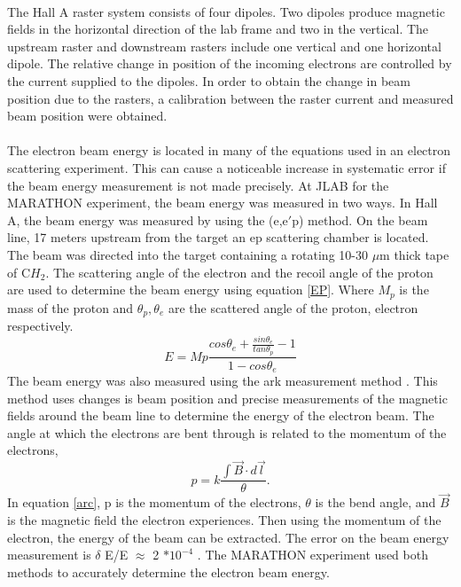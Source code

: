 	 \paragraph{} The Hall A raster system consists of four dipoles. Two dipoles produce magnetic fields in the horizontal direction of the lab frame and two in the vertical. The upstream raster and downstream rasters include one vertical and one horizontal dipole. The relative change in position of the incoming electrons are controlled by the current supplied to the dipoles. In order to obtain the change in beam position due to the rasters, a calibration between the raster current and measured beam position were obtained.  
	 
	 \paragraph{}The electron beam energy is located in many of the equations used in an electron scattering experiment. This can cause a noticeable increase in systematic error if the beam energy measurement is not made precisely. At JLAB for the MARATHON experiment, the beam energy was measured in two ways. In Hall A, the beam energy was measured by using the (e,e$\prime$p) method. On the beam line, 17 meters upstream from the target an ep scattering chamber is located. The beam was directed into the target containing a rotating 10-30 $\mu$m thick tape of C$H_2$. The scattering angle of the electron and the recoil angle of the proton are used to determine the beam energy using equation \ref{EP}. Where $M_p$ is the mass of the proton and $\theta_p, \theta_e$ are the scattered angle of the proton, electron respectively. 
	\begin{equation}
	\label{EP}
	E = Mp \frac{cos\theta_e + \frac{sin\theta_e}{tan\theta_p}-1}{1 - cos\theta_e} 
	\end{equation}
	The beam energy was also measured using the ark measurement method \cite{Flay}. This method uses changes is beam position and precise measurements of the magnetic fields around the beam line to determine the energy of the electron beam. The angle at which the electrons are bent through is related to the momentum of the electrons,
	\begin{equation}
	\label{arc}
	p = k \frac{\int \vec{B} \cdot d\vec{l}}{\theta}.
	\end{equation}	
	In equation \ref{arc}, p is the momentum of the electrons, $\theta$ is the bend angle, and $\vec{B}$ is the magnetic field the electron experiences. Then using the momentum of the electron, the energy of the beam can be extracted. The error on the beam energy measurement is $\delta$ E/E $\approx$ 2 $* 10^{-4} $ \cite{EPMet, Flay}.  The MARATHON experiment used both methods to accurately determine the electron beam energy.
	
